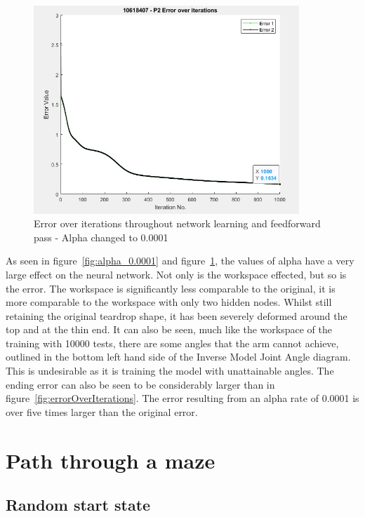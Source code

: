 \documentclass [11pt]{article}
\begin{document}
\begin{figure}[H]
\centerline{\includegraphics[width=10cm]{error_over_itterations_alpha_0001}}
\caption{Error over iterations throughout network learning and feedforward pass - Alpha changed to 0.0001}
\label{fig:error_alpha_0.0001}
\end{figure}

As seen in figure~\ref{fig:alpha_0.0001} and figure~\ref{fig:error_alpha_0.0001}, the values of alpha have a very large effect on the neural network. Not only is the workspace effected, but so is the error. The workspace is significantly less comparable to the original, it is more comparable to the workspace with only two hidden nodes. Whilst still retaining the original teardrop shape, it has been severely deformed around the top and at the thin end. It can also be seen, much like the workspace of the training with 10000 tests, there are some angles that the arm cannot achieve, outlined in the bottom left hand side of the Inverse Model Joint Angle diagram. This is undesirable as it is training the model with unattainable angles. The ending error can also be seen to be considerably larger than in figure~\ref{fig:errorOverIterations}. The error resulting from an alpha rate of 0.0001 is over five times larger than the original error.
  
\section{Path through a maze}
\subsection{Random start state}
\end{document}
